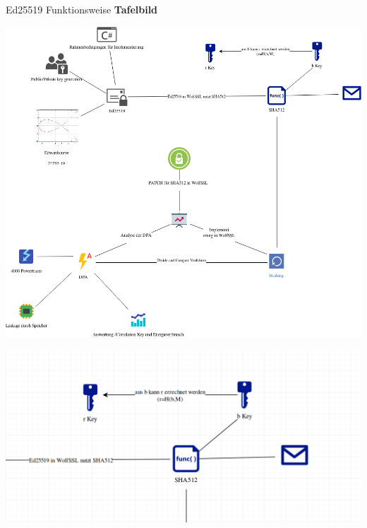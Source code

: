 \documentclass[
  9pt,
  ignorenonframetext,
  aspectratio=169,
]{beamer}
\begin{document}
\begin{frame}{Ed25519 Funktionsweise}
\protect\hypertarget{ed25519-funktionsweise}{}
\textbf{Tafelbild}
\end{frame}

\begin{frame}{}
\protect\hypertarget{section-2}{}
\includegraphics{Abbildungen/ITSEC(1).png}
\end{frame}

\begin{frame}{}
\protect\hypertarget{section-3}{}
\includegraphics{Abbildungen/Punkt2.png}
\end{frame}
\end{document}
